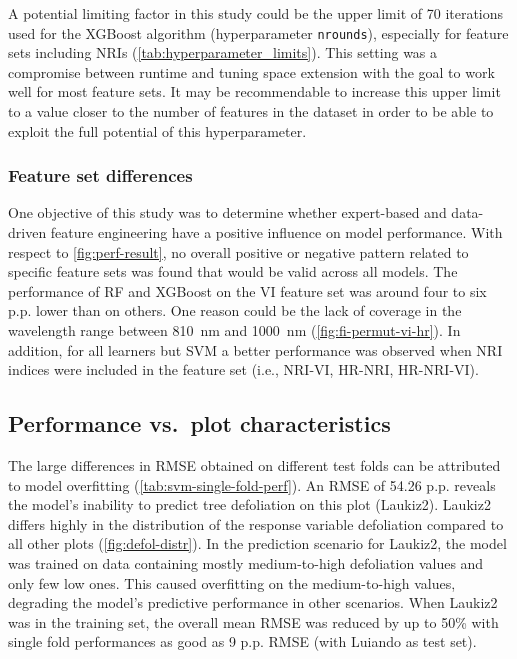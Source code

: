 \documentclass[remotesensing,article,submit,moreauthors,pdftex]{Definitions/mdpi}
\begin{document}
A potential limiting factor in this study could be the upper limit of 70 iterations used for the XGBoost algorithm (hyperparameter \texttt{nrounds}), especially for feature sets including NRIs (\autoref{tab:hyperparameter_limits}).
This setting was a compromise between runtime and tuning space extension with the goal to work well for most feature sets.
It may be recommendable to increase this upper limit to a value closer to the number of features in the dataset in order to be able to exploit the full potential of this hyperparameter.

\subsubsection{Feature set differences}

One objective of this study was to determine whether expert-based and data-driven feature engineering have a positive influence on model performance.
With respect to \autoref{fig:perf-result}, no overall positive or negative pattern related to specific feature sets was found that would be valid across all models.
The performance of RF and XGBoost on the VI feature set was around four to six p.p. lower than on others.
One reason could be the lack of coverage in the wavelength range between 810~nm and 1000~nm (\autoref{fig:fi-permut-vi-hr}).
In addition, for all learners but SVM a better performance was observed when NRI indices were included in the feature set (i.e., NRI-VI, HR-NRI, HR-NRI-VI).

\subsection{Performance vs.\ plot characteristics}
\label{subsec:perf-plot-char}

The large differences in RMSE obtained on different test folds can be attributed to model overfitting (\autoref{tab:svm-single-fold-perf}).
An RMSE of 54.26 p.p. reveals the model's inability to predict tree defoliation on this plot (Laukiz2).
Laukiz2 differs highly in the distribution of the response variable defoliation compared to all other plots (\autoref{fig:defol-distr}).
In the prediction scenario for Laukiz2, the model was trained on data containing mostly medium-to-high defoliation values and only few low ones.
This caused overfitting on the medium-to-high values, degrading the model's predictive performance in other scenarios.
When Laukiz2 was in the training set, the overall mean RMSE was reduced by up to 50\% with single fold performances as good as 9 p.p. RMSE (with Luiando as test set).
\end{document}
